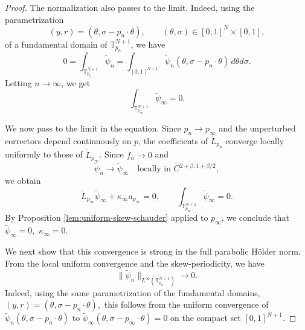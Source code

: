 \documentclass[preprint]{elsarticle}
\numberwithin{equation}{section}
\begin{document}
\begin{proof}
The normalization also passes to the limit. Indeed, using the parametrization
$$
(y,r)=(\theta,\sigma-p_n\cdot\theta),
\qquad
(\theta,\sigma)\in[0,1]^N\times[0,1],
$$
of a fundamental domain of $\mathbb T_{p_n}^{N+1}$, we have
\begin{equation*}
0
=
\int_{\mathbb T_{p_n}^{N+1}}\widetilde\psi_n
=
\int_{[0,1]^{N+1}}
\widetilde\psi_n(\theta,\sigma-p_n\cdot\theta)\,d\theta d\sigma.
\end{equation*}
Letting $n\to\infty$, we get
\begin{equation*}
\int_{\mathbb T_{p_\infty}^{N+1}}\widetilde\psi_\infty=0.
\end{equation*}

We now pass to the limit in the equation. Since $p_n\to p_\infty$ and the unperturbed correctors depend continuously on $p$, the coefficients of $\widetilde L_{p_n}$ converge locally uniformly to those of $\widetilde L_{p_\infty}$. Since
$
f_n\to0
$
and
$$
\widetilde\psi_n\to\widetilde\psi_\infty
\quad\text{locally in }C^{2+\beta,1+\beta/2},
$$
we obtain
\begin{equation*}
\widetilde L_{p_\infty}\widetilde\psi_\infty
+
\kappa_\infty a_{p_\infty}
=0,
\qquad
\int_{\mathbb T_{p_\infty}^{N+1}}\widetilde\psi_\infty=0.
\end{equation*}
By Proposition \ref{lem:uniform-skew-schauder} applied to $p_\infty$, we conclude that $\widetilde\psi_\infty=0,
$ $
\kappa_\infty=0.$

We next show that this convergence is strong in the full parabolic Hölder norm. From the local uniform convergence and the skew-periodicity, we have
\begin{equation*}
\|\widetilde\psi_n\|_{L^\infty(\mathbb T_{p_n}^{N+1})}\to0.
\end{equation*}
Indeed, using the same parametrization of the fundamental domains,
$
(y,r)=(\theta,\sigma-p_n\cdot\theta),
$
this follows from the uniform convergence of
$
\widetilde\psi_n(\theta,\sigma-p_n\cdot\theta)
$
to
$
\widetilde\psi_\infty(\theta,\sigma-p_\infty\cdot\theta)=0
$
on the compact set $[0,1]^{N+1}$.


\end{proof}
\end{document}
